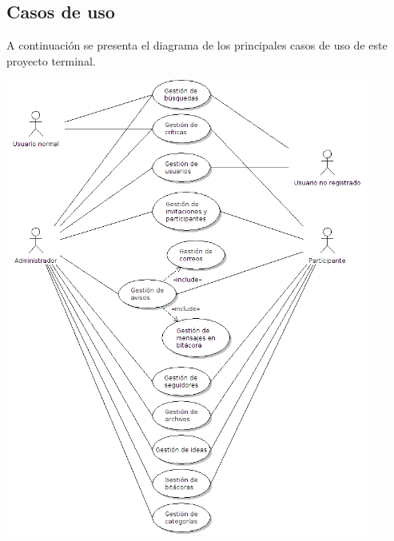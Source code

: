 \documentclass[11pt,letterpaper,titlepage]{article}
\begin{document}


\subsection{Casos de uso}


A continuaci\'on se presenta el diagrama de los principales casos de uso de este proyecto terminal.
\begin{center}
\includegraphics[width=340pt]{casos1.png}
\end{center}
\end{document}
